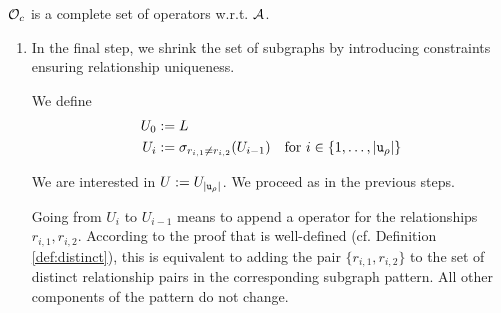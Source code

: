 \begin{proofof}{$\mathcal{O}_c$ is a complete set of operators w.r.t.
                $\mathcal{A}$.}
\begin{enumerate}
      We are interested in
      $L := L_{\card{V_\rho}, \card{\nlabel_\rho(v_\card{V_\rho})}}$.
      As in the previous two steps, we iteratively construct a subgraph pattern
      which produces the same result, using the recursive definition from the
      proof that the  operator is well-defined
      (cf. Definition \ref{def:label-selection}).
      
      Going from $L_{i,j}$ to $L_{i,j-1}$ means to append a 
      for label $l_{i,j}$ on the node variable $v_i$.
      According to the proof that  is well-defined
      (cf. Definition \ref{def:label-selection}), this is equivalent to adding a new label
      to $\nlabel(v_i)$ in the corresponding subgraph pattern.
      All other components of the pattern do not change.
      
      We see that $L$
      contains exactly one  for each label constraint stored
      in $\nlabel_\rho$.
      Therefore, going from the previous pattern $\rho_R$ to a pattern $\rho_L$
      with $\result(\rho_L) = L$,
      means adding all of the label constraints from $\nlabel_\rho$ to
      $\rho_R$. Because there are no label constraints in $\rho_R$, the label
      function in $\rho_L$ simply equals $\nlabel_\rho$.
      
      Thus the generated pattern is
      \[
         \rho_L = (V_\rho, R_\rho, \lambda_\rho, \nlabel_\rho, \rtype_\rho, \emptyset)
      \]
      
    \item %
      In the final step, we shrink the set of subgraphs by introducing
      constraints ensuring relationship uniqueness.
      
      We define
      \begin{align*}
        U_0 &:= L \\
        U_i &:= \sigma_{r_{i,1} \not = r_{i,2}}(U_{i-1})
          ~~\text{ for } i \in \{ 1, \ldots, {\left \vert \texttt{u}_\rho \right \vert} \}
      \end{align*}
      
      We are interested in $U := U_{\left \vert \texttt{u}_\rho \right \vert}$.
      We proceed as in the previous steps.
      
      Going from $U_i$ to $U_{i-1}$ means to append a  operator
      for the relationships $r_{i,1}, r_{i,2}$.
      According to the proof that  is well-defined
      (cf. Definition \ref{def:distinct}), this is equivalent to adding the pair
      $\{r_{i,1}, r_{i,2}\}$ to the set of distinct relationship pairs in the
      corresponding subgraph pattern.
      All other components of the pattern do not change.
      

\end{enumerate}
\end{proofof}
